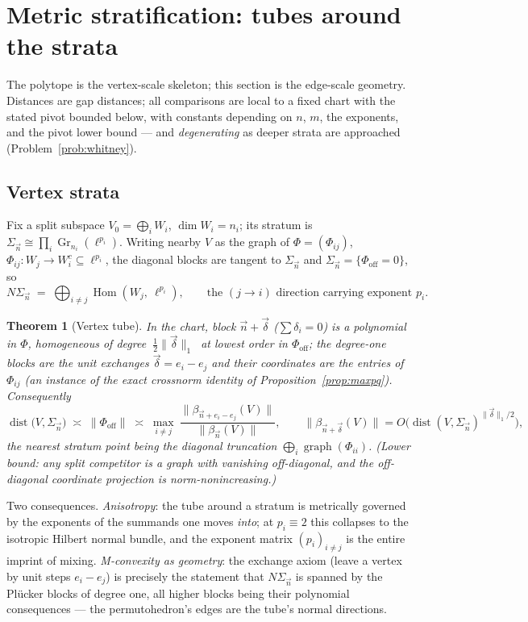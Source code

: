 \documentclass[11pt]{amsart}
\newtheorem{theorem}{Theorem}[section]
\theoremstyle{definition}
\newcommand{\Gr}{\operatorname{Gr}}
\newcommand{\Hom}{\operatorname{Hom}}
\newcommand{\dist}{\operatorname{dist}}
\DeclareMathOperator{\graph}{graph}
\begin{document}
\section{Metric stratification: tubes around the strata}\label{sec:tubes}

The polytope is the vertex-scale skeleton; this section is the edge-scale geometry. Distances are gap distances; all comparisons are local to a fixed chart with the stated pivot bounded below, with constants depending on $n$, $m$, the exponents, and the pivot lower bound --- and \emph{degenerating} as deeper strata are approached (Problem~\ref{prob:whitney}).

\subsection{Vertex strata}

Fix a split subspace $V_0=\bigoplus_iW_i$, $\dim W_i=n_i$; its stratum is $\Sigma_{\vec n}\cong\prod_i\Gr_{n_i}(\ell^{p_i})$. Writing nearby $V$ as the graph of $\Phi=(\Phi_{ij})$, $\Phi_{ij}:W_j\to W_i^c\subseteq\ell^{p_i}$, the diagonal blocks are tangent to $\Sigma_{\vec n}$ and $\Sigma_{\vec n}=\{\Phi_{\mathrm{off}}=0\}$, so
\[
N\Sigma_{\vec n}\;=\;\bigoplus_{i\ne j}\Hom(W_j,\ \ell^{p_i}),\qquad\text{the }(j\!\to\! i)\text{ direction carrying exponent }p_i .
\]

\begin{theorem}[Vertex tube]\label{thm:tube}
In the chart, block $\vec n+\vec\delta$ \textup{(}$\sum\delta_i=0$\textup{)} is a polynomial in $\Phi$, homogeneous of degree $\ \tfrac12\|\vec\delta\|_1\ $ at lowest order in $\Phi_{\mathrm{off}}$; the degree-one blocks are the unit exchanges $\vec\delta=e_i-e_j$ and their coordinates are the entries of $\Phi_{ij}$ \textup{(}an instance of the exact crossnorm identity of Proposition~\ref{prop:maxpq}\textup{)}. Consequently
\[
\dist\big(V,\Sigma_{\vec n}\big)\;\asymp\;\|\Phi_{\mathrm{off}}\|\;\asymp\;\max_{i\ne j}\ \frac{\big\|\beta_{\vec n+e_i-e_j}(V)\big\|}{\big\|\beta_{\vec n}(V)\big\|},
\qquad
\big\|\beta_{\vec n+\vec\delta}(V)\big\|=O\big(\dist(V,\Sigma_{\vec n})^{\|\vec\delta\|_1/2}\big),
\]
the nearest stratum point being the diagonal truncation $\bigoplus_i\graph(\Phi_{ii})$. \textup{(}Lower bound: any split competitor is a graph with vanishing off-diagonal, and the off-diagonal coordinate projection is norm-nonincreasing.\textup{)}
\end{theorem}

Two consequences. \emph{Anisotropy}: the tube around a stratum is metrically governed by the exponents of the summands one moves \emph{into}; at $p_i\equiv2$ this collapses to the isotropic Hilbert normal bundle, and the exponent matrix $(p_i)_{i\ne j}$ is the entire imprint of mixing. \emph{M-convexity as geometry}: the exchange axiom (leave a vertex by unit steps $e_i-e_j$) is precisely the statement that $N\Sigma_{\vec n}$ is spanned by the Pl\"ucker blocks of degree one, all higher blocks being their polynomial consequences --- the permutohedron's edges are the tube's normal directions.
\end{document}
